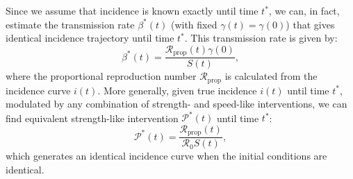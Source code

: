 \documentclass[12pt]{article}
\newcommand{\Rx}[1]{\ensuremath{{\mathcal R}_{#1}}\xspace}
\newcommand{\Ro}{\Rx{0}}
\newcommand{\Rprop}{\Rx{\mathrm{prop}}}
\newcommand{\PP}{{\mathcal P}}
\begin{document}
Since we assume that incidence is known exactly until time $t^\ast$, we can, in fact, estimate the transmission rate $\beta^\ast(t)$ (with fixed $\gamma(t)=\gamma(0)$) that gives identical incidence trajectory until time $t^\ast$.
This transmission rate is given by:
\begin{equation}
\beta^\ast(t) = \frac{\Rprop(t)\gamma(0)}{S(t)},
\end{equation}
where the proportional reproduction number $\Rprop$ is calculated from the incidence curve $i(t)$.
More generally, given true incidence $i(t)$ until time $t^\ast$, modulated by any combination of strength- and speed-like interventions, we can find equivalent strength-like intervention $\PP^\ast(t)$ until time $t^\ast$:
\begin{equation}
\PP^\ast(t) = \frac{\Rprop(t)}{\Ro S(t)},
\end{equation}
which generates an identical incidence curve when the initial conditions are identical.


\end{document}
